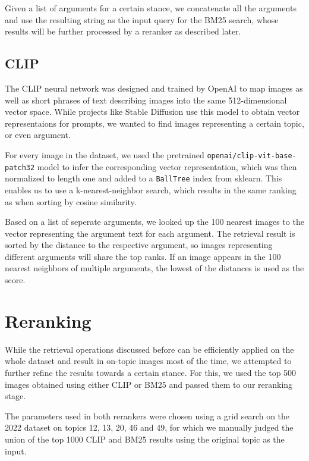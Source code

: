 \documentclass[
]{ceurart}
\begin{document}
Given a list of arguments for a certain stance, we concatenate all the arguments and use the resulting string as the input query for the BM25 search, whose results will be further processed by a reranker as described later.

\subsection{CLIP}

The CLIP \cite{radford2021learning} neural network was designed and trained by OpenAI to map images as well as short phrases of text describing images into the same 512-dimensional vector space. While projects like Stable Diffusion use this model to obtain vector representaions for prompts, we wanted to find images representing a certain topic, or even argument.

For every image in the dataset, we used the pretrained \texttt{openai/clip-vit-base-patch32} model to infer the corresponding vector representation, which was then normalized to length one and added to a \texttt{BallTree} index from sklearn. This enables us to use a k-nearest-neighbor search, which results in the same ranking as when sorting by cosine similarity.

Based on a list of seperate arguments, we looked up the 100 nearest images to the vector representing the argument text for each argument. The retrieval result is sorted by the distance to the respective argument, so images representing different arguments will share the top ranks. If an image appears in the 100 nearest neighbors of multiple arguments, the lowest of the distances is used as the score.

\section{Reranking}

While the retrieval operations discussed before can be efficiently applied on the whole dataset and result in on-topic images most of the time, we attempted to further refine the results towards a certain stance. For this, we used the top 500 images obtained using either CLIP or BM25 and passed them to our reranking stage.

The parameters used in both rerankers were chosen using a grid search on the 2022 dataset on topics 12, 13, 20, 46 and 49, for which we manually judged the union of the top 1000 CLIP and BM25 results using the original topic as the input.
\end{document}
